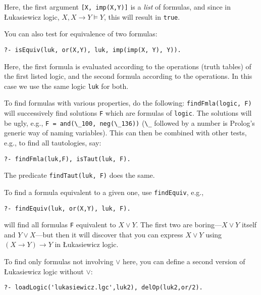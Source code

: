 \documentclass[
]{article}
\newcommand{\passthrough}[1]{#1}
\begin{document}
Here, the first argument \passthrough{\lstinline![X, imp(X,Y)]!} is a
\emph{list} of formulas, and since in Łukasiewicz logic,
\(X, X \to Y \models Y\), this will result in
\passthrough{\lstinline!true!}.

You can also test for equivalence of two formulas:

\begin{lstlisting}
?- isEquiv(luk, or(X,Y), luk, imp(imp(X, Y), Y)).
\end{lstlisting}

Here, the first formula is evaluated according to the operations (truth
tables) of the first listed logic, and the second formula according to
the operations. In this case we use the same logic
\passthrough{\lstinline!luk!} for both.

To find formulas with various properties, do the following:
\passthrough{\lstinline!findFmla(logic, F)!} will successively find
solutions \passthrough{\lstinline!F!} which are formulas of
\passthrough{\lstinline!logic!}. The solutions will be ugly, e.g.,
\passthrough{\lstinline!F = and(\_100, neg(\_136))!}
(\passthrough{\lstinline!\_!} followed by a number is Prolog's generic
way of naming variables). This can then be combined with other tests,
e.g., to find all tautologies, say:

\begin{lstlisting}
?- findFmla(luk,F), isTaut(luk, F).
\end{lstlisting}

The predicate \passthrough{\lstinline!findTaut(luk, F)!} does the same.

To find a formula equivalent to a given one, use
\passthrough{\lstinline!findEquiv!}, e.g.,

\begin{lstlisting}
?- findEquiv(luk, or(X,Y), luk, F).
\end{lstlisting}

will find all formulas \passthrough{\lstinline!F!} equivalent to
\(X \lor Y\). The first two are boring---\(X \lor Y\) itself and
\(Y \lor X\)---but then it will discover that you can express
\(X \lor Y\) using \((X \to Y) \to Y\) in Łukasiewicz logic.

To find only formulas not involving \(\lor\) here, you can define a
second version of Łukasiewicz logic without \(\lor\):

\begin{lstlisting}
?- loadLogic('lukasiewicz.lgc',luk2), delOp(luk2,or/2).
\end{lstlisting}
\end{document}
